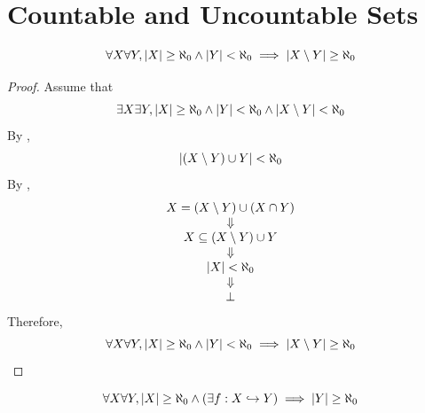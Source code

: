 \section{Countable and Uncountable Sets}

\begin{theorem} \label{an:thm:infinite-set-minus-finite-set-is-infinite}
    \[
    \forall X \forall Y, \abs*{X} \geq \aleph_{0} \land
    \abs*{Y} < \aleph_{0} \implies \abs*{X \setminus Y} \geq \aleph_{0}
    \]
\end{theorem}

\begin{proof}
    Assume that
    \[
    \exists X \exists Y, \abs*{X} \geq \aleph_{0} \land
    \abs*{Y} < \aleph_{0} \land \abs*{X \setminus Y} < \aleph_{0}
    \]
    By ,
    \[
    \abs*{(X \setminus Y) \cup Y} < \aleph_{0}
    \]
    By ,
    \[
    \begin{array}{c}
        X = (X \setminus Y) \cup (X \cap Y) \\
        \Downarrow \\
        X \subseteq (X \setminus Y) \cup Y \\
        \Downarrow \\
        \abs*{X} < \aleph_{0} \\
        \Downarrow \\
        \bot
    \end{array}
    \]
    Therefore,
    \[
    \forall X \forall Y, \abs*{X} \geq \aleph_{0} \land
    \abs*{Y} < \aleph_{0} \implies \abs*{X \setminus Y} \geq \aleph_{0}
    \]
\end{proof}

\bigskip

\begin{theorem} \label{an:thm:injection-from-infinite-set-implies-infinite}
    \[
    \forall X \forall Y, \abs*{X} \geq \aleph_{0} \land
    \paren*{\exists f: X \hookrightarrow Y} \implies \abs*{Y} \geq \aleph_{0}
    \]
\end{theorem}


